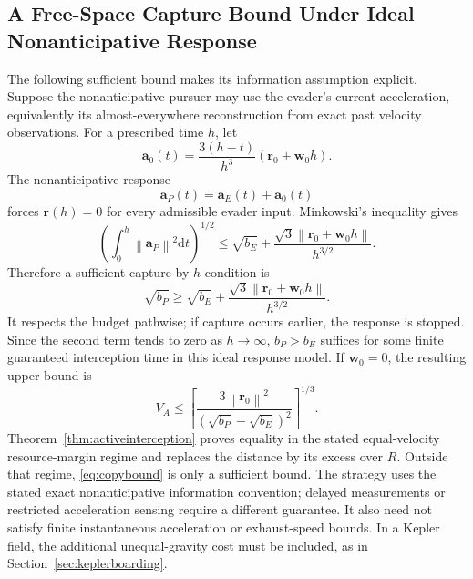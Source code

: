 \documentclass[journal,a4paper]{IEEEtran}
\newcommand{\norm}[1]{\left\|#1\right\|}
\newcommand{\dd}{\mathrm d}
\begin{document}
\subsection{A Free-Space Capture Bound Under Ideal Nonanticipative Response}
The following sufficient bound makes its information assumption explicit. Suppose the nonanticipative pursuer may use the evader's current acceleration, equivalently its almost-everywhere reconstruction from exact past velocity observations. For a prescribed time $h$, let
\begin{equation}
 \mathbf a_0(t)=\frac{3(h-t)}{h^3}(\mathbf r_0+\mathbf w_0h).
\end{equation}
The nonanticipative response
\begin{equation}
 \mathbf a_P(t)=\mathbf a_E(t)+\mathbf a_0(t)
 \label{eq:copystrategy}
\end{equation}
forces $\mathbf r(h)=0$ for every admissible evader input. Minkowski's inequality gives
\begin{equation}
 \left(\int_0^h\norm{\mathbf a_P}^2\dd t\right)^{1/2}
 \le\sqrt{b_E}+
       \frac{\sqrt3\norm{\mathbf r_0+\mathbf w_0h}}{h^{3/2}}.
\end{equation}
Therefore a sufficient capture-by-$h$ condition is
\begin{equation}
 \boxed{\sqrt{b_P}\ge\sqrt{b_E}
       +\frac{\sqrt3\norm{\mathbf r_0+\mathbf w_0h}}{h^{3/2}}.}
 \label{eq:copybound}
\end{equation}
It respects the budget pathwise; if capture occurs earlier, the response is stopped. Since the second term tends to zero as $h\to\infty$, $b_P>b_E$ suffices for some finite guaranteed interception time in this ideal response model. If $\mathbf w_0=0$, the resulting upper bound is
\begin{equation}
 V_A\le\left[\frac{3\norm{\mathbf r_0}^2}
                    {(\sqrt{b_P}-\sqrt{b_E})^2}\right]^{1/3}.
\end{equation}
Theorem~\ref{thm:activeinterception} proves equality in the stated equal-velocity resource-margin regime and replaces the distance by its excess over $R$. Outside that regime, \eqref{eq:copybound} is only a sufficient bound. The strategy uses the stated exact nonanticipative information convention; delayed measurements or restricted acceleration sensing require a different guarantee. It also need not satisfy finite instantaneous acceleration or exhaust-speed bounds. In a Kepler field, the additional unequal-gravity cost must be included, as in Section~\ref{sec:keplerboarding}.
\end{document}
